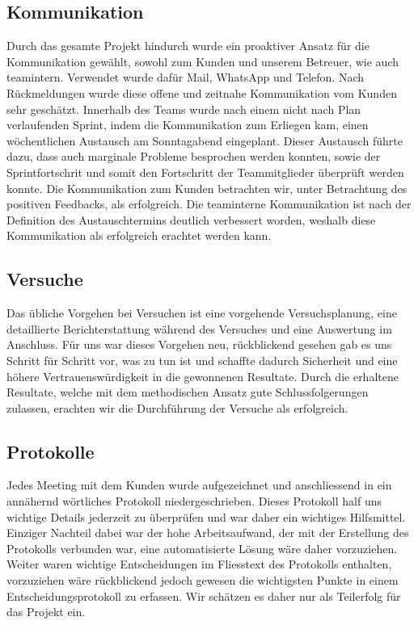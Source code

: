 \subsection{Kommunikation}
Durch das gesamte Projekt hindurch wurde ein proaktiver Ansatz für die Kommunikation gewählt, sowohl zum Kunden und unserem Betreuer, wie auch teamintern. Verwendet wurde dafür Mail, WhatsApp und Telefon. Nach Rückmeldungen wurde diese offene und zeitnahe Kommunikation vom Kunden sehr geschätzt. Innerhalb des Teams wurde nach einem nicht nach Plan verlaufenden Sprint, indem die Kommunikation zum Erliegen kam, einen wöchentlichen Austausch am Sonntagabend eingeplant. Dieser Austausch führte dazu, dass auch marginale Probleme besprochen werden konnten, sowie der Sprintfortschrit und somit den Fortschritt der Teammitglieder überprüft werden konnte. Die Kommunikation zum Kunden betrachten wir, unter Betrachtung des positiven Feedbacks, als erfolgreich. Die teaminterne Kommunikation ist nach der Definition des Austauschtermins deutlich verbessert worden, weshalb diese Kommunikation als erfolgreich erachtet werden kann.

\subsection{Versuche}
Das übliche Vorgehen bei Versuchen ist eine vorgehende Versuchsplanung, eine detaillierte Berichterstattung während des Versuches und eine Auswertung im Anschluss. Für uns war dieses Vorgehen neu, rückblickend gesehen gab es uns Schritt für Schritt vor, was zu tun ist und schaffte dadurch Sicherheit und eine höhere Vertrauenswürdigkeit in die gewonnenen Resultate. Durch die erhaltene Resultate, welche mit dem methodischen Ansatz gute Schlussfolgerungen zulassen, erachten wir die Durchführung der Versuche als erfolgreich.

\subsection{Protokolle}
Jedes Meeting mit dem Kunden wurde aufgezeichnet und anschliessend in ein annähernd wörtliches Protokoll niedergeschrieben. Dieses Protokoll half uns wichtige Details jederzeit zu überprüfen und war daher ein wichtiges Hilfsmittel. Einziger Nachteil dabei war der hohe Arbeitsaufwand, der mit der Erstellung des Protokolls verbunden war, eine automatisierte Lösung wäre daher vorzuziehen. Weiter waren wichtige Entscheidungen im Fliesstext des Protokolls enthalten, vorzuziehen wäre rückblickend jedoch gewesen die wichtigsten Punkte in einem Entscheidungsprotokoll zu erfassen. Wir schätzen es daher nur als Teilerfolg für das Projekt ein.
